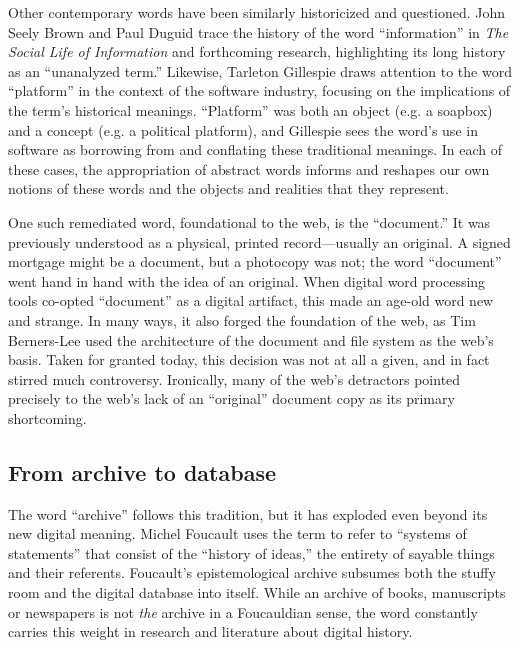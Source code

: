 Other contemporary words have been similarly historicized and questioned. John Seely Brown and Paul Duguid trace the history of the word ``information'' in \emph{The Social Life of Information} and forthcoming research, highlighting its long history as an ``unanalyzed term.''\autocite{brown_social_2002} Likewise, Tarleton Gillespie draws attention to the word ``platform'' in the context of the software industry, focusing on the implications of the term's historical meanings.\autocite{gillespie_politics_2010} ``Platform'' was both an object (e.g. a soapbox) and a concept (e.g. a political platform), and Gillespie sees the word's use in software as borrowing from and conflating these traditional meanings. In each of these cases, the appropriation of abstract words informs and reshapes our own notions of these words and the objects and realities that they represent.

One such remediated word, foundational to the web, is the ``document.'' It was previously understood as a physical, printed record---usually an original. A signed mortgage might be a document, but a photocopy was not; the word ``document'' went hand in hand with the idea of an original. When digital word processing tools co-opted ``document'' as a digital artifact, this made an age-old word new and strange. In many ways, it also forged the foundation of the web, as Tim Berners-Lee used the architecture of the document and file system as the web's basis.\autocite{berners-lee_weaving_2000} Taken for granted today, this decision was not at all a given, and in fact stirred much controversy. Ironically, many of the web's detractors pointed precisely to the web's lack of an ``original'' document copy as its primary shortcoming.\autocites[See, e.g.,][Chapter 18]{lanier_who_2013}{nelson_ted_1999}

\subsection{From archive to database}

The word ``archive'' follows this tradition, but it has exploded even beyond its new digital meaning. Michel Foucault uses the term to refer to ``systems of statements'' that consist of the ``history of ideas,'' the entirety of sayable things and their referents.\autocite[128-129, 137]{foucault_archaeology_1972} Foucault's epistemological archive subsumes both the stuffy room and the digital database into itself. While an archive of books, manuscripts or newspapers is not \emph{the} archive in a Foucauldian sense, the word constantly carries this weight in research and literature about digital history.

